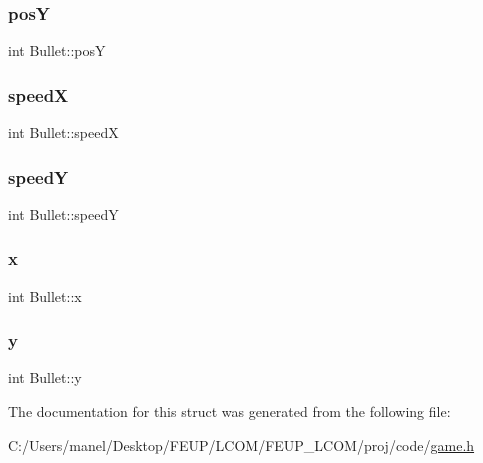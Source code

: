 \mbox{\label{struct_bullet_a644e6895da8de9104266f5258aeed8f6}} 
\subsubsection{\texorpdfstring{posY}{posY}}
{\footnotesize\ttfamily int Bullet\+::posY}

\mbox{\label{struct_bullet_a82599c14ed9a73741bc856d476176da3}} 
\subsubsection{\texorpdfstring{speedX}{speedX}}
{\footnotesize\ttfamily int Bullet\+::speedX}

\mbox{\label{struct_bullet_a26093711aaa5ded2d5665ee5132672d8}} 
\subsubsection{\texorpdfstring{speedY}{speedY}}
{\footnotesize\ttfamily int Bullet\+::speedY}

\mbox{\label{struct_bullet_add8da3ee8a3265a38ebbfe8a254ebb19}} 
\subsubsection{\texorpdfstring{x}{x}}
{\footnotesize\ttfamily int Bullet\+::x}

\mbox{\label{struct_bullet_a524e0ee515b1418341cdd8f8dffce1ee}} 
\subsubsection{\texorpdfstring{y}{y}}
{\footnotesize\ttfamily int Bullet\+::y}



The documentation for this struct was generated from the following file\+:\begin{DoxyCompactItemize}
\item 
C\+:/\+Users/manel/\+Desktop/\+F\+E\+U\+P/\+L\+C\+O\+M/\+F\+E\+U\+P\+\_\+\+L\+C\+O\+M/proj/code/\mbox{\hyperlink{game_8h}{game.\+h}}\end{DoxyCompactItemize}
